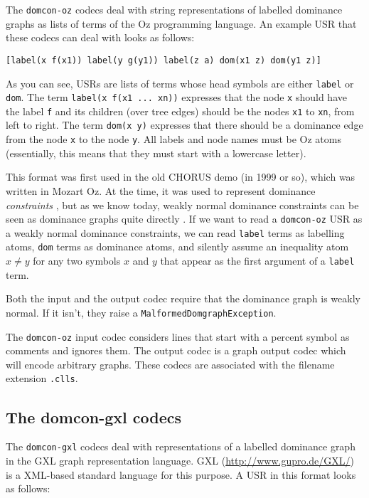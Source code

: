 The \verb?domcon-oz? codecs deal with string representations of
labelled dominance graphs as lists of terms of the Oz programming
language. An example USR that these codecs can deal with looks as
follows:

\begin{verbatim}
[label(x f(x1)) label(y g(y1)) label(z a) dom(x1 z) dom(y1 z)]
\end{verbatim}

As you can see, USRs are lists of terms whose head symbols are either
\verb?label? or \verb?dom?. The term \verb?label(x f(x1 ... xn))?
expresses that the node \verb?x? should have the label \verb?f? and
its children (over tree edges) should be the nodes \verb?x1? to
\verb?xn?, from left to right. The term \verb?dom(x y)? expresses that
there should be a dominance edge from the node \verb?x? to the node
\verb?y?. All labels and node names must be Oz atoms (essentially,
this means that they must start with a lowercase letter).

This format was first used in the old CHORUS demo (in 1999 or so),
which was written in Mozart Oz. At the time, it was used to represent
dominance \emph{constraints} \cite{clls2000}, but as we know today,
weakly normal dominance constraints can be seen as dominance graphs
quite directly \cite{Koller04}. If we want to read a \verb?domcon-oz?
USR as a weakly normal dominance constraints, we can read \verb?label?
terms as labelling atoms, \verb?dom? terms as dominance atoms, and
silently assume an inequality atom $x \neq y$ for any two symbols $x$
and $y$ that appear as the first argument of a \verb?label? term.

Both the input and the output codec require that the dominance graph
is weakly normal. If it isn't, they raise a
\verb?MalformedDomgraphException?.

The \verb?domcon-oz? input codec considers lines that start with a
percent symbol as comments and ignores them. The output codec is a
graph output codec which will encode arbitrary graphs. These codecs
are associated with the filename extension \verb?.clls?.



\subsection{The domcon-gxl codecs}

The \verb?domcon-gxl? codecs deal with representations of a labelled
dominance graph in the GXL graph representation language. GXL
(\url{http://www.gupro.de/GXL/}) is a XML-based standard language for
this purpose. A USR in this format looks as follows:

